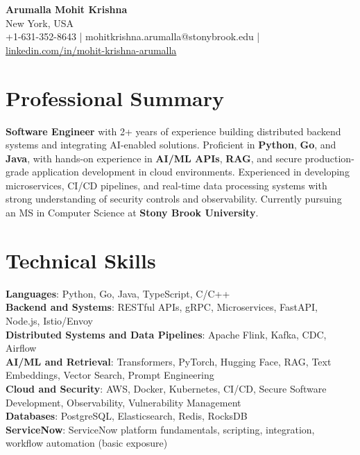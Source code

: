 \documentclass[letterpaper,11pt]{article}
\begin{document}
\begin{center}
  {\Large \textbf{Arumalla Mohit Krishna}} \\
  New York, USA \\
  +1-631-352-8643 \enspace | \enspace mohitkrishna.arumalla@stonybrook.edu \enspace | \enspace \href{https://www.linkedin.com/in/mohit-krishna-arumalla}{linkedin.com/in/mohit-krishna-arumalla}
\end{center}

\section{Professional Summary}
  \begin{itemize}[leftmargin=0.15in, label={}]
    \small{\item{
     \textbf{Software Engineer} with 2+ years of experience building distributed backend systems and integrating AI-enabled solutions. Proficient in \textbf{Python}, \textbf{Go}, and \textbf{Java}, with hands-on experience in \textbf{AI/ML APIs}, \textbf{RAG}, and secure production-grade application development in cloud environments. Experienced in developing microservices, CI/CD pipelines, and real-time data processing systems with strong understanding of security controls and observability. Currently pursuing an MS in Computer Science at \textbf{Stony Brook University}.
    }}
  \end{itemize}
\vspace{-16pt}

\section{Technical Skills}
 \begin{itemize}[leftmargin=0.15in, label={}]
    \small{\item{
     \textbf{Languages}: Python, Go, Java, TypeScript, C/C++ \\
     \textbf{Backend and Systems}: RESTful APIs, gRPC, Microservices, FastAPI, Node.js, Istio/Envoy \\
     \textbf{Distributed Systems and Data Pipelines}: Apache Flink, Kafka, CDC, Airflow \\
     \textbf{AI/ML and Retrieval}: Transformers, PyTorch, Hugging Face, RAG, Text Embeddings, Vector Search, Prompt Engineering \\
     \textbf{Cloud and Security}: AWS, Docker, Kubernetes, CI/CD, Secure Software Development, Observability, Vulnerability Management \\
     \textbf{Databases}: PostgreSQL, Elasticsearch, Redis, RocksDB \\
     \textbf{ServiceNow}: ServiceNow platform fundamentals, scripting, integration, workflow automation (basic exposure)
    }}
 \end{itemize}
\vspace{-16pt}
\end{document}
